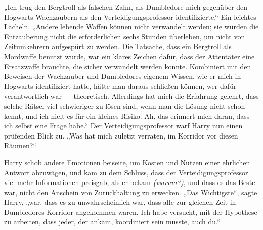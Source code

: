 „Ich trug den Bergtroll als falschen Zahn, als Dumbledore mich gegenüber den Hogwarts-Wachzaubern als den Verteidigungsprofessor identifizierte.“
Ein leichtes Lächeln.
„Andere lebende Waffen können nicht verwandelt werden; sie würden die Entzauberung nicht die erforderlichen sechs Stunden überleben, um nicht von Zeitumkehrern aufgespürt zu werden. Die Tatsache, dass ein Bergtroll als Mordwaffe benutzt wurde, war ein klares Zeichen dafür, dass der Attentäter eine Ersatzwaffe brauchte, die sicher verwandelt werden konnte. Kombiniert mit den Beweisen der Wachzauber und Dumbledores eigenem Wissen, wie er mich in Hogwarts identifiziert hatte, hätte man daraus schließen können, wer dafür verantwortlich war — theoretisch. Allerdings hat mich die Erfahrung gelehrt, dass solche Rätsel viel schwieriger zu lösen sind, wenn man die Lösung nicht schon kennt, und ich hielt es für ein kleines Risiko. Ah, das erinnert mich daran, dass ich selbst eine Frage habe.“
Der Verteidigungsprofessor warf Harry nun einen prüfenden Blick zu.
„Was hat mich zuletzt verraten, im Korridor vor diesen Räumen?“

Harry schob andere Emotionen beiseite, um Kosten und Nutzen einer ehrlichen Antwort abzuwägen, und kam zu dem Schluss, dass der Verteidigungsprofessor viel mehr Informationen preisgab, als er bekam \emph{(warum?)}, und dass es das Beste war, nicht den Anschein von Zurückhaltung zu erwecken.
„Das Wichtigste“, sagte Harry, „war, dass es zu unwahrscheinlich war, dass alle zur gleichen Zeit in Dumbledores Korridor angekommen waren. Ich habe versucht, mit der Hypothese zu arbeiten, dass jeder, der ankam, koordiniert sein musste, auch du.“

